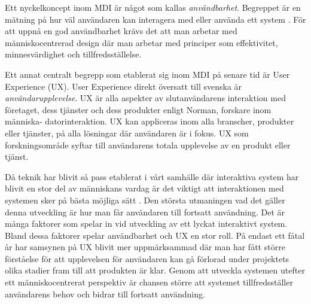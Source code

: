 Ett nyckelkoncept inom MDI är något som kallas \textit{användbarhet}\cite{Myers1998ATechnology}. Begreppet är en mätning på hur väl användaren kan interagera med eller använda ett system \cite{Blanton2009Human-ComputerInteraction}. För att uppnå en god användbarhet krävs det att man arbetar med människocentrerad design där man arbetar med principer som effektivitet, minnesvärdighet och tillfredsställelse\cite{Blanton2009Human-ComputerInteraction}. 
\newline

Ett annat centralt begrepp som etablerat sig inom MDI på senare tid är User Experience (UX). User Experience direkt översatt till svenska är \textit{användarupplevelse}. UX är alla aspekter av slutanvändarens interaktion med företaget, dess tjänster och dess produkter enligt Norman\cite{NormanTheUX}, forskare inom människa- datorinteraktion. UX kan appliceras inom alla branscher, produkter eller tjänster, på alla lösningar där användaren är i fokus\cite{Axbom2013JagAxbom}. UX som forskningsområde syftar till användarens totala upplevelse av en produkt eller tjänst\cite{20Mastery}. 
\newline

Då teknik har blivit så pass etablerat i vårt samhälle där interaktiva system har blivit en stor del av människans vardag är det viktigt att interaktionen med systemen sker på bästa möjliga sätt \cite{Six2011TheUXmatters}. Den största utmaningen vad det gäller denna utveckling är hur man får användaren till fortsatt användning\cite{SafferCreatingDevices}. Det är många faktorer som spelar in vid utveckling av ett lyckat interaktivt system. Bland dessa faktorer spelar användbarhet och UX en stor roll\cite{SafferCreatingDevices}. På endast ett fåtal år har samsynen på UX blivit mer uppmärksammad där man har fått större förståelse för att upplevelsen för användaren kan gå förlorad under projektets olika stadier fram till att produkten är klar\cite{BrannmarkGustavJansaterHandledareInstitutionenInformatik}. Genom att utveckla systemen utefter ett människocentrerat perspektiv är chansen större att systemet tillfredsställer användarens behov och bidrar till fortsatt användning\cite{May2012ApplyingApp}. 



